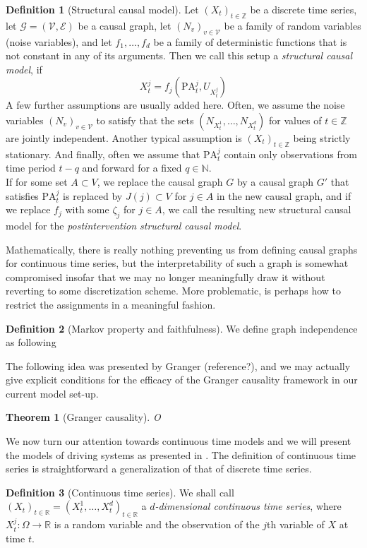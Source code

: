 \documentclass[11pt, a4paper]{memoir}
\theoremstyle{plain}
\newtheorem{thm}{Theorem}
\theoremstyle{definition}
\newtheorem{defn}{Definition}
\newcommand{\mN}{\mathbb{N}}
\newcommand{\mZ}{\mathbb{Z}}
\newcommand{\mR}{\mathbb{R}}
\begin{document}
\begin{defn}[Structural causal model]
Let $(X_t)_{t\in \mZ}$ be a discrete time series, let $\mathcal{G}=(\mathcal{V},\mathcal{E})$ be a causal graph, let $(N_v)_{v\in \mathcal{V}}$ be a family of random variables (noise variables), and let $f_1,\ldots,f_d$ be a family of deterministic functions that is not constant in any of its arguments. Then we call this setup a \emph{structural causal model}, if
$$X_t^j=f_j(\text{PA}_t^j,U_{X_{t}^j})$$
A few further assumptions are usually added here. Often, we assume the noise variables $(N_v)_{v\in \mathcal{V}}$ to satisfy that the sets $(N_{X_t^1},\ldots,N_{X_t^{d}})$ for values of $t\in \mZ$ are jointly independent. Another typical assumption is $(X_t)_{t\in \mZ}$ being strictly stationary. And finally, often we assume that $\text{PA}_t^j$ contain only observations from time period $t-q$ and forward for a fixed $q\in \mN$.\\
If for some set $A\subset V$, we replace the causal graph $G$ by a causal graph $G'$ that satisfies $\text{PA}_t^j$ is replaced by $J(j)\subset V$ for $j\in A$ in the new causal graph, and if we replace $f_j$ with some $\zeta_j$ for $j\in A$, we call the resulting new structural causal model for the \textit{postintervention structural causal model}.
\end{defn}
Mathematically, there is really nothing preventing us from defining causal graphs for continuous time series, but the interpretability of such a graph is somewhat compromised insofar that we may no longer meaningfully draw it without reverting to some discretization scheme. More problematic, is perhaps how to restrict the assignments in a meaningful fashion.
\begin{defn}[Markov property and faithfulness]
We define graph independence as following
\end{defn}
The following idea was presented by Granger (reference?), and we may actually give explicit conditions for the efficacy of the Granger causality framework in our current model set-up.
\begin{thm}[Granger causality]
O
\end{thm}
We now turn our attention towards continuous time models and we will present the models of driving systems as presented in \cite{mathFound}. The definition of continuous time series is straightforward a generalization of that of discrete time series.
\begin{defn}[Continuous time series]
We shall call $(X_t)_{t\in \mR}=(X_t^{1},\ldots,X_{t}^d)_{t\in \mR}$ a \emph{$d$-dimensional continuous time series}, where $X_t^j:\Omega\to \mR$ is a random variable and the observation of the $j$th variable of $X$ at time $t$.
\end{defn}
\end{document}

